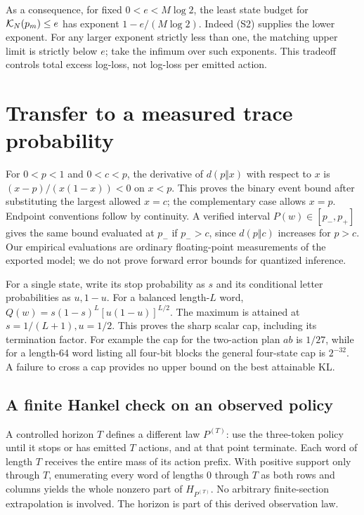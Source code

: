 As a consequence, for fixed $0<e<M\log2$, the least state budget for $\mathcal K_N(p_m)\le e$ has exponent $1-e/(M\log2)$. Indeed (S2) supplies the lower exponent. For any larger exponent strictly less than one, the matching upper limit is strictly below $e$; take the infimum over such exponents. This tradeoff controls total excess log-loss, not log-loss per emitted action.

\section{Transfer to a measured trace probability}\label{app:transfer}
For \(0<p<1\) and \(0<c<p\), the derivative of \(d(p\Vert x)\) with respect to \(x\) is \((x-p)/(x(1-x))<0\) on \(x<p\). This proves the binary event bound after substituting the largest allowed \(x=c\); the complementary case allows \(x=p\). Endpoint conventions follow by continuity. A verified interval \(P(w)\in[p_-,p_+]\) gives the same bound evaluated at \(p_-\) if \(p_->c\), since \(d(p\Vert c)\) increases for \(p>c\). Our empirical evaluations are ordinary floating-point measurements of the exported model; we do not prove forward error bounds for quantized inference.

For a single state, write its stop probability as \(s\) and its conditional letter probabilities as \(u,1-u\). For a balanced length-\(L\) word,
\(Q(w)=s(1-s)^L[u(1-u)]^{L/2}\).
The maximum is attained at \(s=1/(L+1),u=1/2\). This proves the sharp scalar cap, including its termination factor. For example the cap for the two-action plan \(ab\) is \(1/27\), while for a length-64 word listing all four-bit blocks the general four-state cap is \(2^{-32}\). A failure to cross a cap provides no upper bound on the best attainable KL.

\subsection{A finite Hankel check on an observed policy}
A controlled horizon \(T\) defines a different law \(P^{(T)}\): use the three-token policy until it stops or has emitted \(T\) actions, and at that point terminate. Each word of length \(T\) receives the entire mass of its action prefix. With positive support only through \(T\), enumerating every word of lengths \(0\) through \(T\) as both rows and columns yields the whole nonzero part of \(H_{P^{(T)}}\). No arbitrary finite-section extrapolation is involved. The horizon is part of this derived observation law.

